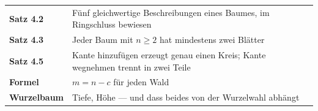 \begin{merksatz}
\begin{center}
\renewcommand{\arraystretch}{1.5}
\begin{tabular}{@{}P{3.0cm}P{5.6cm}@{}}
\toprule
\textbf{Satz 4.2} & Fünf gleichwertige Beschreibungen eines Baumes, im Ringschluss bewiesen\\
\textbf{Satz 4.3} & Jeder Baum mit $n \ge 2$ hat mindestens zwei Blätter\\
\textbf{Satz 4.5} & Kante hinzufügen erzeugt genau einen Kreis; Kante wegnehmen trennt in zwei Teile\\
\textbf{Formel} & $m = n - c$ für jeden Wald\\
\textbf{Wurzelbaum} & Tiefe, Höhe --- und dass beides von der Wurzelwahl abhängt\\
\bottomrule
\end{tabular}
\end{center}

\begin{center}
\begin{minipage}{0.88\textwidth}
\end{minipage}
\end{center}
\end{merksatz}
